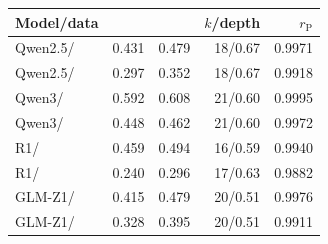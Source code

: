 \begin{tabular}{@{}lrrrr@{}}
\toprule
Model/data & \AlgOne{} & \DiffPCA{} & $k$/depth & $r_{\mathrm{P}}$ \\
\midrule
Qwen2.5/\MATHD{} & 0.431 & 0.479 & 18/0.67 & 0.9971 \\
Qwen2.5/\MGSM{} & 0.297 & 0.352 & 18/0.67 & 0.9918 \\
Qwen3/\MATHD{} & 0.592 & 0.608 & 21/0.60 & 0.9995 \\
Qwen3/\MGSM{} & 0.448 & 0.462 & 21/0.60 & 0.9972 \\
R1/\MATHD{} & 0.459 & 0.494 & 16/0.59 & 0.9940 \\
R1/\MGSM{} & 0.240 & 0.296 & 17/0.63 & 0.9882 \\
GLM-Z1/\MATHD{} & 0.415 & 0.479 & 20/0.51 & 0.9976 \\
GLM-Z1/\MGSM{} & 0.328 & 0.395 & 20/0.51 & 0.9911 \\
\bottomrule
\end{tabular}
